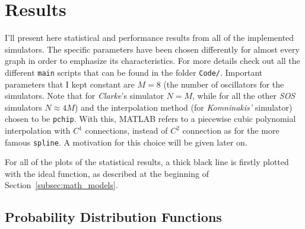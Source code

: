\section{Results} %
\label{sec:results}

I'll present here statistical and performance results from all of the implemented simulators. The specific parameters have been chosen differently for almost every graph in order to emphasize its characteristics. For more details check out all the different \texttt{main} scripts that can be found in the folder \texttt{Code/}. Important parameters that I kept constant are $M=8$ (the number of oscillators for the simulators. Note that for \textit{Clarke}'s simulator $N=M$, while for all the other \textit{SOS} simulators $N \approx 4M$) and the interpolation method (for \textit{Komninakis'} simulator) chosen to be \texttt{pchip}. With this, MATLAB refers to a piecewise cubic polynomial interpolation with $C^1$ connections, instead of $C^2$ connection as for the more famous \texttt{spline}. A motivation for this choice will be given later on.

For all of the plots of the statistical results, a thick black line is firstly plotted with the ideal function, as described at the beginning of Section~\ref{subsec:math_models}.

\subsection{Probability Distribution Functions}

